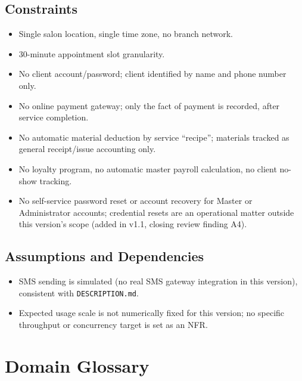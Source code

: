 \documentclass[11pt,a4paper]{article}
\begin{document}
\subsection{Constraints}
\label{sec:constraints}
\begin{itemize}[leftmargin=1.2cm]
  \item Single salon location, single time zone, no branch network.
  \item 30-minute appointment slot granularity.
  \item No client account/password; client identified by name and phone
    number only.
  \item No online payment gateway; only the fact of payment is recorded,
    after service completion.
  \item No automatic material deduction by service ``recipe''; materials
    tracked as general receipt/issue accounting only.
  \item No loyalty program, no automatic master payroll calculation, no
    client no-show tracking.
  \item No self-service password reset or account recovery for Master or
    Administrator accounts; credential resets are an operational matter
    outside this version's scope (added in v1.1, closing review finding A4).
\end{itemize}

\subsection{Assumptions and Dependencies}
\begin{itemize}[leftmargin=1.2cm]
  \item SMS sending is simulated (no real SMS gateway integration in this
    version), consistent with \texttt{DESCRIPTION.md}.
  \item Expected usage scale is not numerically fixed for this version; no
    specific throughput or concurrency target is set as an NFR.
\end{itemize}

\section{Domain Glossary}
\label{sec:glossary}
\end{document}
